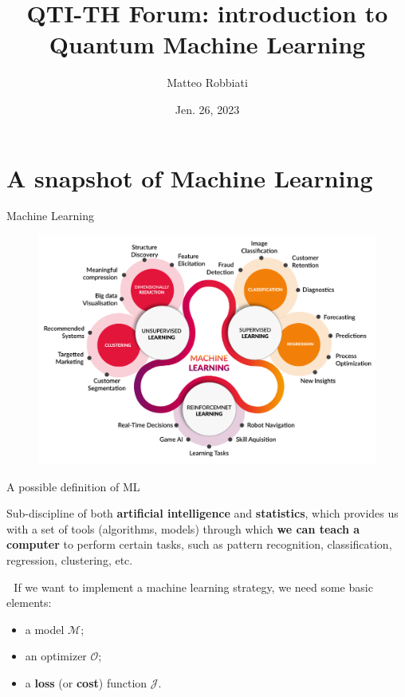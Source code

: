 \documentclass[8pt, xcolor={svgnames}, hyperref={colorlinks,linkcolor=black, citecolor=amethyst, urlcolor=amethyst}]{beamer}
\title{QTI-TH Forum: introduction to Quantum Machine Learning}
\date{Jen. 26, 2023}
\author[Matteo Robbiati]{Matteo Robbiati}
\begin{document}
\maketitle

\section{A snapshot of Machine Learning}


\begin{frame}{Machine Learning}
    \begin{figure}[H]
\centering
  \includegraphics[width=1\linewidth]{figures/ml_types.png}
\end{figure}
\end{frame}

\begin{frame}{A possible definition of ML}
    \large
    
    \begin{tcolorbox}[colback=amethyst!20, title=Machine Learning]
    
    Sub-discipline of both \textbf{artificial intelligence} 
    and \textbf{statistics}, which provides us with a set of tools (algorithms, models) 
    through which \textbf{we can teach a computer} to perform certain tasks, such 
    as pattern recognition, classification, regression, clustering, etc.
    \end{tcolorbox}

\pause

    \vspace{0.5cm}

    \faArrowCircleRight\,\, If we want to implement a machine learning strategy, 
    we need some basic elements:
    \begin{itemize}[noitemsep]
        \item[\faEdit] a model $\mathcal{M}$;
        \item[\faWrench] an optimizer $\mathcal{O}$;
        \item[\faPaypal] a \textbf{loss} (or \textbf{cost}) function $\mathcal{J}$.
        
    \end{itemize}
\end{frame}
\end{document}
